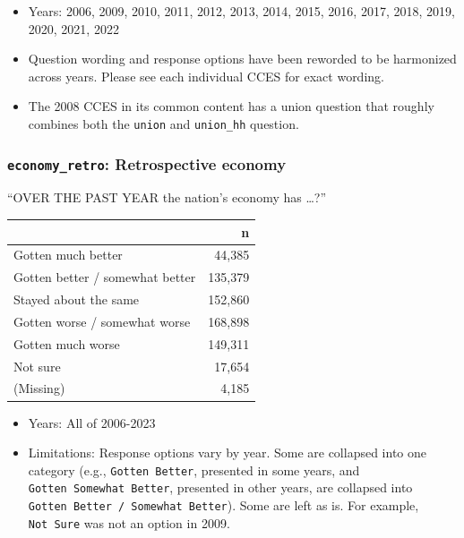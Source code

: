 \documentclass[10pt,article,oneside]{memoir}
\theoremstyle{definition}
\begin{document}
\begin{itemize}
\tightlist
\item
  Years: 2006, 2009, 2010, 2011, 2012, 2013, 2014, 2015, 2016, 2017,
  2018, 2019, 2020, 2021, 2022
\item
  Question wording and response options have been reworded to be
  harmonized across years. Please see each individual CCES for exact
  wording.
\item
  The 2008 CCES in its common content has a union question that roughly
  combines both the \texttt{union} and \texttt{union\_hh} question.
\end{itemize}

\subsubsection{\texorpdfstring{\texttt{economy\_retro}: Retrospective
economy}{economy\_retro: Retrospective economy}}\label{economy_retro-retrospective-economy}

``OVER THE PAST YEAR the nation's economy has \ldots?''

\begin{table}[H]
\centering
\begin{tabular}[t]{lr}
\toprule
 & n\\
\midrule
Gotten much better & 44,385\\
Gotten better / somewhat better & 135,379\\
Stayed about the same & 152,860\\
Gotten worse / somewhat worse & 168,898\\
Gotten much worse & 149,311\\
Not sure & 17,654\\
(Missing) & 4,185\\
\bottomrule
\end{tabular}
\end{table}

\begin{itemize}
\tightlist
\item
  Years: All of 2006-2023
\item
  Limitations: Response options vary by year. Some are collapsed into
  one category (e.g., \texttt{Gotten\ Better}, presented in some years,
  and \texttt{Gotten\ Somewhat\ Better}, presented in other years, are
  collapsed into \texttt{Gotten\ Better\ /\ Somewhat\ Better}). Some are
  left as is. For example, \texttt{Not\ Sure} was not an option in 2009.
\end{itemize}
\end{document}
